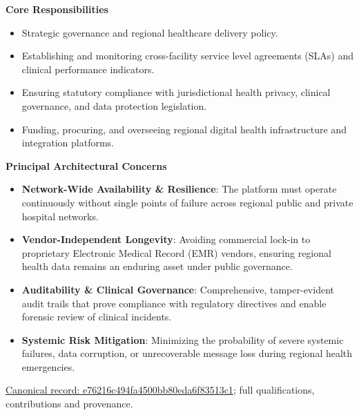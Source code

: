 \par\medskip\textbf{Core Responsibilities}\par


\begin{itemize}


\item Strategic governance and regional healthcare delivery policy.

\item Establishing and monitoring cross-facility service level agreements (SLAs) and clinical performance indicators.

\item Ensuring statutory compliance with jurisdictional health privacy, clinical governance, and data protection legislation.

\item Funding, procuring, and overseeing regional digital health infrastructure and integration platforms.

\end{itemize}


\par\medskip\textbf{Principal Architectural Concerns}\par


\begin{itemize}


\item \textbf{Network-Wide Availability \& Resilience}: The platform must operate continuously without single points of failure across regional public and private hospital networks.

\item \textbf{Vendor-Independent Longevity}: Avoiding commercial lock-in to proprietary Electronic Medical Record (EMR) vendors, ensuring regional health data remains an enduring asset under public governance.

\item \textbf{Auditability \& Clinical Governance}: Comprehensive, tamper-evident audit trails that prove compliance with regulatory directives and enable forensic review of clinical incidents.

\item \textbf{Systemic Risk Mitigation}: Minimizing the probability of severe systemic failures, data corruption, or unrecoverable message loss during regional health emergencies.

\end{itemize}

{\footnotesize \href{../../../../continuum/motivation/stakeholder/e76216c494fa4500bb80eda6f83513c1.md}{Canonical record: e76216c494fa4500bb80eda6f83513c1}; full qualifications, contributions and provenance.}\par
